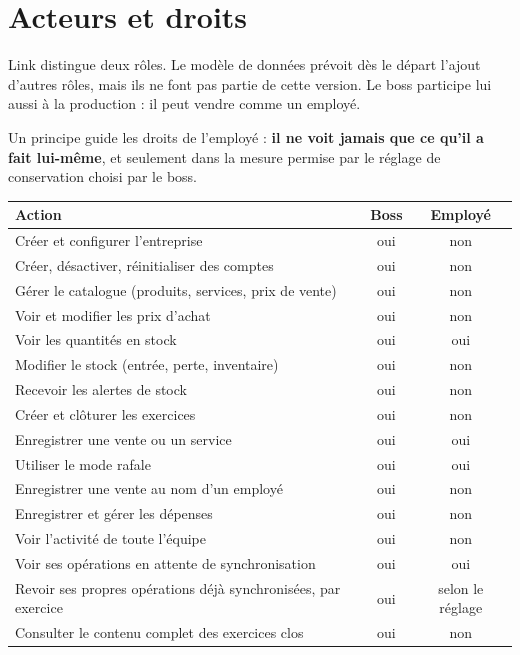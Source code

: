 \documentclass[11pt,a4paper]{article}
\begin{document}
	\section{Acteurs et droits}
	Link distingue deux rôles. Le modèle de données prévoit dès le départ l'ajout d'autres rôles, mais ils ne font pas partie de cette version. Le boss participe lui aussi à la production : il peut vendre comme un employé.

	Un principe guide les droits de l'employé : \textbf{il ne voit jamais que ce qu'il a fait lui-même}, et seulement dans la mesure permise par le réglage de conservation choisi par le boss.

	\begin{center}
		\small
		\begin{tabular}{p{7.2cm} c c}
			\toprule
			\textbf{Action} & \textbf{Boss} & \textbf{Employé} \\
			\midrule
			Créer et configurer l'entreprise & oui & non \\
			Créer, désactiver, réinitialiser des comptes & oui & non \\
			Gérer le catalogue (produits, services, prix de vente) & oui & non \\
			Voir et modifier les prix d'achat & oui & non \\
			Voir les quantités en stock & oui & oui \\
			Modifier le stock (entrée, perte, inventaire) & oui & non \\
			Recevoir les alertes de stock & oui & non \\
			Créer et clôturer les exercices & oui & non \\
			Enregistrer une vente ou un service & oui & oui \\
			Utiliser le mode rafale & oui & oui \\
			Enregistrer une vente au nom d'un employé & oui & non \\
			Enregistrer et gérer les dépenses & oui & non \\
			Voir l'activité de toute l'équipe & oui & non \\
			Voir ses opérations en attente de synchronisation & oui & oui \\
			Revoir ses propres opérations déjà synchronisées, par exercice & oui & selon le réglage \\
			Consulter le contenu complet des exercices clos & oui & non \\

\end{tabular}
\end{center}
\end{document}

